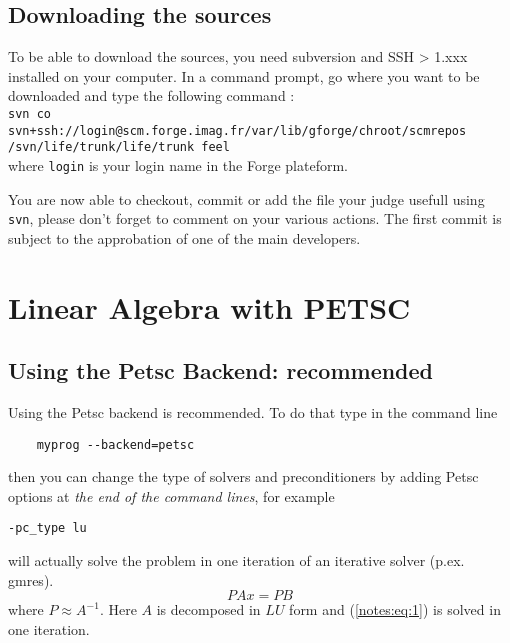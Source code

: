 \subsection{Downloading the sources}
\label{sec:download-sources}

To be able to download the \feel sources, you need subversion and SSH > 1.xxx
installed on your computer. In a command prompt, go where you want \feel to be
downloaded and type the following command :
\\ \verb|svn co svn+ssh://login@scm.forge.imag.fr/var/lib/gforge/chroot/scmrepos|
\\ \verb|/svn/life/trunk/life/trunk feel|
\\ where \verb|login| is your login name in the Forge plateform.

You are now able to checkout, commit or add the file your judge usefull using \verb|svn|, please don't forget to comment on your various actions. The first commit is subject to the approbation of one of the main developers.


\section{Linear Algebra with PETSC}

\subsection{Using the Petsc Backend: recommended}

Using the Petsc backend is recommended. To do that type in the command line
\begin{lstlisting}
    myprog --backend=petsc
  \end{lstlisting}
  then you can change the type of solvers and preconditioners by
  adding Petsc options at \emph{the end of the command lines}, for example
\begin{verbatim}
-pc_type lu
\end{verbatim}
  will actually solve the problem in one iteration of an iterative solver
  (p.ex. gmres).
  \begin{equation}
    \label{notes:eq:1}
    P A x = P B
  \end{equation}
  where $P \approx A^{-1}$. Here $A$ is decomposed in $LU$ form and
  (\ref{notes:eq:1}) is solved in one iteration.

